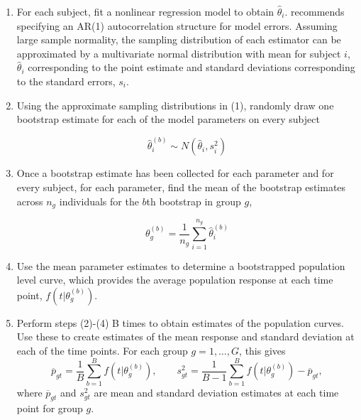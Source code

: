\begin{enumerate}
\item For each subject, fit a nonlinear regression model to obtain $\hat{\theta}_i$. \citet{oleson2017detecting} recommends specifying an AR(1) autocorrelation structure for model errors. Assuming large sample normality, the sampling distribution of each estimator can be approximated by a multivariate normal distribution with mean for subject $i$, $\hat{\theta}_i$ corresponding to the point estimate and standard deviations corresponding to the standard errors, $s_i$.

\item Using the approximate sampling distributions in (1), randomly draw one bootstrap estimate for each of the model parameters on every subject 

\begin{equation}
\hat{\theta}_i^{(b)} \sim N( \hat{\theta}_i, s_i^2)
\end{equation}

\item Once a bootstrap estimate has been collected for each parameter and for every subject, for each parameter, find the mean of the bootstrap estimates across $n_g$ individuals for the $b$th bootstrap in group $g$,

\begin{equation}
\theta_g^{(b)} = \frac{1}{n_g} \sum_{i=1}^{n_g} \hat{\theta}_i^{(b)}
\end{equation}

\item Use the mean parameter estimates to determine a bootstrapped population level curve, which provides the average population response at each time point, $f(t| \theta_g^{(b)})$.

\item Perform steps (2)-(4) B times to obtain estimates of the population curves. Use these to create estimates of the mean response and standard deviation at each of the time points. For each group $g = 1, \dots, G$, this gives
\begin{equation}
\overline{p}_{gt} = \frac1B \sum_{b=1}^B f(t| \theta_g^{(b)}), \qquad s_{gt}^2 = \frac{1}{B-1} \sum_{b=1}^B  f(t| \theta_g^{(b)}) - \overline{p}_{gt},
\end{equation}
where $\overline{p}_{gt}$ and $s_{gt}^2$ are mean and standard deviation estimates at each time point for group $g$.
\end{enumerate}

